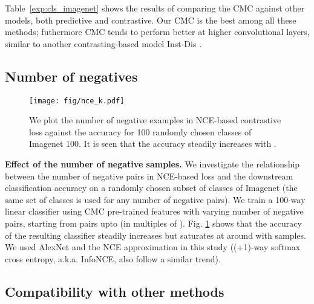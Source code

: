 \documentclass[10pt,twocolumn,letterpaper]{article}
\newcommand{\header}[1]{\vspace{0.05in}\noindent\textbf{#1}}
\newcommand{\citep}[1]{\cite{#1}}
\begin{document}
Table~\ref{exp:cls_imagenet} shows the results of comparing the CMC against other models, both predictive and contrastive. Our CMC is the best among all these methods; futhermore CMC tends to perform better at higher convolutional layers, similar to another contrasting-based model Inst-Dis \citep{wu2018unsupervised}.

\subsection{Number of negatives}\label{sec:imgnet}

\begin{figure}[t]
\centering
\texttt{[image: fig/nce\_k.pdf]}
\caption{\small{We plot the number of negative examples  in NCE-based contrastive loss against the accuracy for 100 randomly chosen classes of Imagenet 100. It is seen that the accuracy steadily increases with .}}
\label{fig:num_nce}
\end{figure} 
\header{Effect of the number of negative samples.}
\label{sec:num_neg}
We investigate the relationship between the number of negative pairs  in NCE-based loss and the downstream classification accuracy on a randomly chosen subset of  classes of Imagenet (the same set of classes is used for any number of negative pairs). We train a 100-way linear classifier using CMC pre-trained features with varying number of negative pairs, starting from  pairs upto  (in multiples of ). Fig. \ref{fig:num_nce} shows that the accuracy of the resulting classifier steadily increases but saturates at around  with  samples. We used AlexNet and the NCE approximation in this study ((+1)-way softmax cross entropy, a.k.a. InfoNCE, also follow a similar trend). 

\subsection{Compatibility with other methods}
\end{document}
